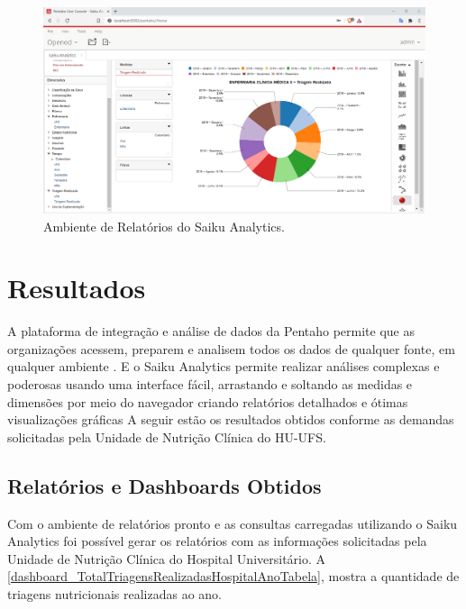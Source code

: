 \newpage
\begin{figure}[htb]
	\caption{\label{fig_saikuanalytics}Ambiente de Relatórios do Saiku Analytics.}
	\begin{center}
	    \includegraphics[scale=0.45]{Imagens/figura - saikudashboard.png}
	\end{center}
\end{figure}

\section{Resultados}

A plataforma de integração e análise de dados da Pentaho permite que as organizações acessem, preparem e analisem todos os dados de qualquer fonte, em qualquer ambiente \cite{pentahosite}. E o Saiku Analytics permite realizar análises complexas e poderosas usando uma interface fácil, arrastando e soltando as medidas e dimensões por meio do navegador criando relatórios detalhados e ótimas visualizações gráficas \cite{meteoribisite} A seguir estão  os resultados obtidos conforme as demandas solicitadas pela Unidade de Nutrição Clínica do HU-UFS.

\subsection{Relatórios e Dashboards Obtidos}
Com o ambiente de relatórios pronto e as consultas carregadas utilizando o Saiku Analytics foi possível gerar os relatórios com as informações solicitadas pela Unidade de Nutrição Clínica do Hospital Universitário. A \autoref{dashboard_TotalTriagensRealizadasHospitalAnoTabela}, mostra a quantidade de triagens nutricionais realizadas ao ano.

